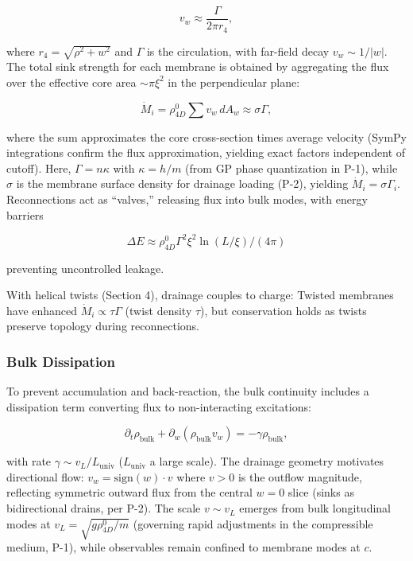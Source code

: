 \begin{equation}
v_w \approx \frac{\Gamma}{2\pi r_4},
\end{equation}

where $r_4 = \sqrt{\rho^2 + w^2}$ and $\Gamma$ is the circulation, with far-field decay $v_w \sim 1/|w|$. The total sink strength for each membrane is obtained by aggregating the flux over the effective core area $\sim \pi \xi^2$ in the perpendicular plane:

\begin{equation}
\dot{M}_i = \rho_{4D}^0 \sum v_w \, dA_w \approx \sigma \Gamma,
\end{equation}

where the sum approximates the core cross-section times average velocity (SymPy integrations confirm the flux approximation, yielding exact factors independent of cutoff). Here, $\Gamma = n \kappa$ with $\kappa = h / m$ (from GP phase quantization in P-1), while $\sigma$ is the membrane surface density for drainage loading (P-2), yielding $\dot{M}_i = \sigma \Gamma_i$. Reconnections act as ``valves,'' releasing flux into bulk modes, with energy barriers

\begin{equation}
\Delta E \approx \rho_{4D}^0 \Gamma^2 \xi^2 \ln(L / \xi) / (4\pi)
\end{equation}

preventing uncontrolled leakage.

With helical twists (Section 4), drainage couples to charge: Twisted membranes have enhanced $\dot{M}_i \propto \tau \Gamma$ (twist density $\tau$), but conservation holds as twists preserve topology during reconnections.

\subsubsection{Bulk Dissipation}
To prevent accumulation and back-reaction, the bulk continuity includes a dissipation term converting flux to non-interacting excitations:

\begin{equation}
\partial_t \rho_{\text{bulk}} + \partial_w (\rho_{\text{bulk}} v_w) = -\gamma \rho_{\text{bulk}},
\end{equation}

with rate $\gamma \sim v_L / L_{\text{univ}}$ ($L_{\text{univ}}$ a large scale). The drainage geometry motivates directional flow: $v_w = \text{sign}(w) \cdot v$ where $v > 0$ is the outflow magnitude, reflecting symmetric outward flux from the central $w=0$ slice (sinks as bidirectional drains, per P-2). The scale $v \sim v_L$ emerges from bulk longitudinal modes at $v_L = \sqrt{g \rho_{4D}^0 / m}$ (governing rapid adjustments in the compressible medium, P-1), while observables remain confined to membrane modes at $c$.

